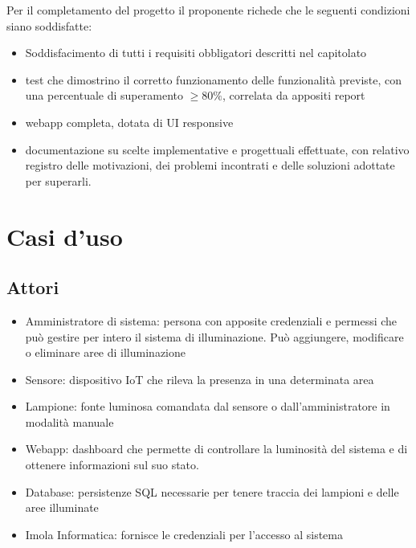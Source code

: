 \documentclass[12pt]{article}
\begin{document}
Per il completamento del progetto il proponente richede che le seguenti condizioni siano soddisfatte:
\begin{itemize}
	\item Soddisfacimento di tutti i requisiti obbligatori descritti nel capitolato
	\item test che dimostrino il corretto funzionamento delle funzionalità previste, con una percentuale di superamento \begin{math}\geq 80\% \end{math}, correlata da appositi report
	\item  webapp completa, dotata di UI responsive
	\item documentazione su scelte implementative e progettuali effettuate, con relativo registro delle motivazioni, dei problemi incontrati e delle soluzioni adottate per superarli.
\end{itemize}


\section{Casi d'uso}
\subsection{Attori}
\begin{itemize}
	\item Amministratore di sistema: persona con apposite credenziali e permessi che può gestire per intero il sistema di illuminazione. Può aggiungere, modificare o eliminare aree di illuminazione
	\item Sensore: dispositivo IoT che rileva la presenza in una determinata area
	\item Lampione: fonte luminosa comandata dal sensore o dall'amministratore in modalità manuale
	\item Webapp: dashboard che permette di controllare la luminosità del sistema e di ottenere informazioni sul suo stato.
	\item Database: persistenze SQL necessarie per tenere traccia dei lampioni e delle aree illuminate
	\item Imola Informatica: fornisce le credenziali per l'accesso al sistema
\end{itemize}
\pagebreak
\end{document}
